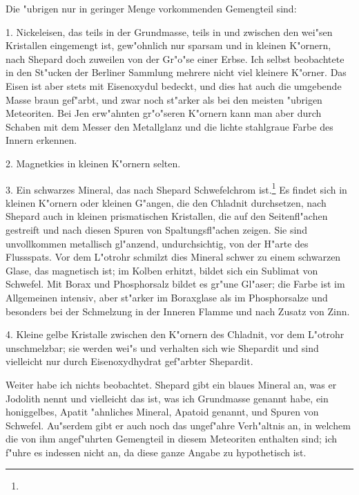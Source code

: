 \documentclass[a4paper, 11pt, oneside]{article}
\begin{document}
Die "ubrigen nur in geringer Menge vorkommenden Gemengteil sind:

1. Nickeleisen, das teils in der Grundmasse, teils in und zwischen den wei"sen Kristallen eingemengt ist, gew"ohnlich nur sparsam und in kleinen K"ornern, nach Shepard doch zuweilen von der Gr"o"se einer Erbse. Ich selbst beobachtete in den St"ucken der Berliner Sammlung mehrere nicht viel kleinere K"orner. Das Eisen ist aber stets mit Eisenoxydul bedeckt, und dies hat auch die umgebende Masse braun gef"arbt, und zwar noch st"arker als bei den meisten "ubrigen Meteoriten. Bei Jen erw"ahnten gr"o"seren K"ornern kann man aber durch Schaben mit dem Messer den Metallglanz und die lichte stahlgraue Farbe des Innern erkennen.

2. Magnetkies in kleinen K"ornern selten.

3. Ein schwarzes Mineral, das nach Shepard Schwefelchrom ist.\footnote{} Es findet sich in kleinen K"ornern oder kleinen G"angen, die den Chladnit durchsetzen, nach Shepard auch in kleinen prismatischen Kristallen, die auf den Seitenfl"achen gestreift und nach diesen Spuren von Spaltungsfl"achen zeigen. Sie sind unvollkommen metallisch gl"anzend, undurchsichtig, von der H"arte des Flussspats. Vor dem L"otrohr schmilzt dies Mineral schwer zu einem schwarzen Glase, das magnetisch ist; im Kolben erhitzt, bildet sich ein Sublimat von Schwefel. Mit Borax und Phosphorsalz bildet es gr"une Gl"aser; die Farbe ist im Allgemeinen intensiv, aber st"arker im Boraxglase als im Phosphorsalze und besonders bei der Schmelzung in der Inneren Flamme und nach Zusatz von Zinn.

4. Kleine gelbe Kristalle zwischen den K"ornern des Chladnit, vor dem L"otrohr unschmelzbar; sie werden wei"s und verhalten sich wie Shepardit und sind vielleicht nur durch Eisenoxydhydrat gef"arbter Shepardit.

Weiter habe ich nichts beobachtet. Shepard gibt ein blaues Mineral an, was er Jodolith nennt und vielleicht das ist, was ich Grundmasse genannt habe, ein honiggelbes, Apatit "ahnliches Mineral, Apatoid genannt, und Spuren von Schwefel. Au"serdem gibt er auch noch das ungef"ahre Verh"altnis an, in welchem die von ihm angef"uhrten Gemengteil in diesem Meteoriten enthalten sind; ich f"uhre es indessen nicht an, da diese ganze Angabe zu hypothetisch ist.
\end{document}
